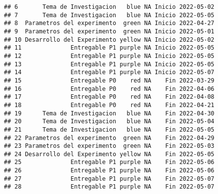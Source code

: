 \documentclass[
]{article}
\newenvironment{Shaded}{\begin{snugshade}}{\end{snugshade}}
\newcommand{\CommentTok}[1]{\textcolor[rgb]{0.56,0.35,0.01}{\textit{#1}}}
\begin{document}
\begin{verbatim}
## 6       Tema de Investigacion   blue NA Inicio 2022-05-02
## 7       Tema de Investigacion   blue NA Inicio 2022-05-05
## 8  Parametros del experimento  green NA Inicio 2022-04-27
## 9  Parametros del experimento  green NA Inicio 2022-05-01
## 10 Desarrollo del Experimento yellow NA Inicio 2022-05-02
## 11              Entregable P1 purple NA Inicio 2022-05-05
## 12              Entregable P1 purple NA Inicio 2022-05-05
## 13              Entregable P1 purple NA Inicio 2022-05-05
## 14              Entregable P1 purple NA Inicio 2022-05-07
## 15              Entregable P0    red NA    Fin 2022-03-29
## 16              Entregable P0    red NA    Fin 2022-04-06
## 17              Entregable P0    red NA    Fin 2022-04-08
## 18              Entregable P0    red NA    Fin 2022-04-21
## 19      Tema de Investigacion   blue NA    Fin 2022-04-30
## 20      Tema de Investigacion   blue NA    Fin 2022-05-04
## 21      Tema de Investigacion   blue NA    Fin 2022-05-05
## 22 Parametros del experimento  green NA    Fin 2022-04-29
## 23 Parametros del experimento  green NA    Fin 2022-05-03
## 24 Desarrollo del Experimento yellow NA    Fin 2022-05-05
## 25              Entregable P1 purple NA    Fin 2022-05-06
## 26              Entregable P1 purple NA    Fin 2022-05-06
## 27              Entregable P1 purple NA    Fin 2022-05-07
## 28              Entregable P1 purple NA    Fin 2022-05-07
\end{verbatim}

\begin{Shaded}
\end{Shaded}
\end{document}
